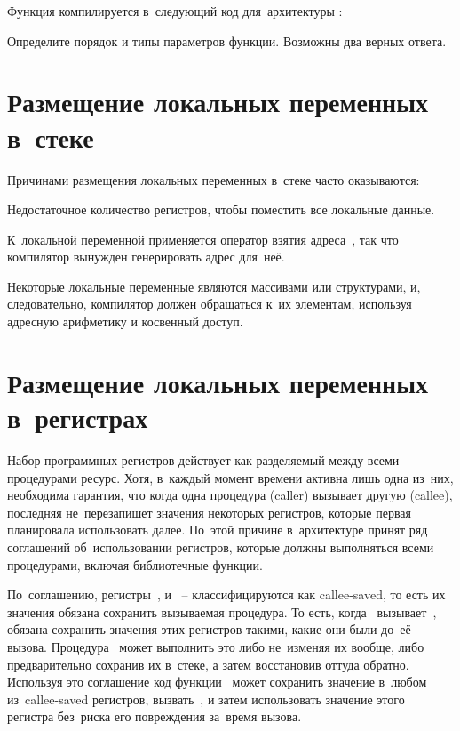 \noindent Функция компилируется в~следующий код для~архитектуры :


\noindent Определите порядок и типы параметров функции. Возможны два верных ответа.



\section{Размещение локальных переменных в~стеке}
Причинами размещения локальных переменных в~стеке часто оказываются:
\begin{itemfeature}
  \item Недостаточное количество регистров, чтобы поместить все локальные данные.
  \item К~локальной переменной применяется оператор взятия адреса~\code{\&}, так что компилятор вынужден генерировать адрес для~неё.
  \item Некоторые локальные переменные являются массивами или структурами, и, следовательно, компилятор должен обращаться к~их элементам, используя адресную арифметику и косвенный доступ.
\end{itemfeature}



\section{Размещение локальных переменных в~регистрах}
Набор программных регистров действует как разделяемый между всеми процедурами ресурс. Хотя, в~каждый момент времени активна лишь одна из~них, необходима гарантия, что когда одна процедура (\textenglish{caller}) вызывает другую (\textenglish{callee}), последняя не~перезапишет значения некоторых регистров, которые первая планировала использовать далее. По~этой причине в~архитектуре  принят ряд соглашений об~использовании регистров, которые должны выполняться всеми процедурами, включая библиотечные функции.

По~соглашению, регистры~,  и ~--  классифицируются как \textenglish{callee-saved}, то есть их значения обязана сохранить вызываемая процедура. То есть, когда~ вызывает~,  обязана сохранить значения этих регистров такими, какие они были до~её вызова. Процедура~ может выполнить это либо не~изменяя их вообще, либо предварительно сохранив их в~стеке, а затем восстановив оттуда обратно. Используя это соглашение код функции~ может сохранить значение в~любом из~\textenglish{callee-saved} регистров, вызвать~, и затем использовать значение этого регистра без~риска его повреждения за~время вызова.

